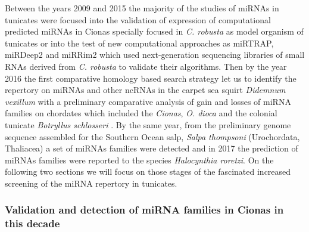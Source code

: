 \documentclass[graybox]{svmult}
\begin{document}
Between the years 2009 and 2015 the majority of the studies of miRNAs in 
tunicates were focused into the validation of expression of computational 
predicted miRNAs in Cionas specially focused in \textit{C. robusta} as 
model organism of tunicates or into the test of new computational approaches as 
miRTRAP, miRDeep2 and miRRim2 which used next-generation sequencing libraries 
of 
small RNAs derived from \textit{C. robusta} to validate their algorithms. 
Then by the year 2016 the first comparative homology based search strategy let 
us to identify the repertory on miRNAs and other ncRNAs in the carpet sea 
squirt 
\textit{Didemnum vexillum} with a preliminary comparative analysis of gain and 
losses of miRNA families on chordates which included the \textit{Cionas}, 
\textit{O. dioca} and the colonial tunicate \textit{Botryllus schlosseri} 
\cite{Velandia-Huerto2016}. By the same year, from the preliminary genome 
sequence assembled for the Southern Ocean salp, \textit{Salpa thompsoni} 
(Urochordata, Thaliacea) a set of miRNAs families were detected \cite{Jue2016} 
and in 2017 the prediction of miRNAs families were reported to the species 
\textit{Halocynthia roretzi}. On the following two sections we will focus on 
those stages of the fascinated increased screening of the miRNA repertory in 
tunicates.

\subsubsection{Validation and detection of miRNA families in Cionas in this 
decade}
\end{document}
